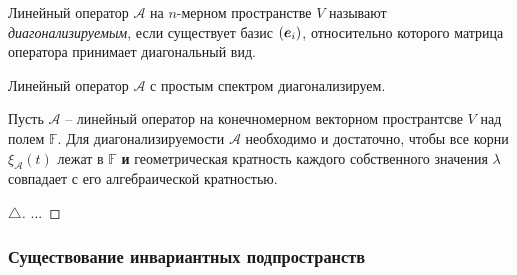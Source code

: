 \begin{to_def} 
    Линейный оператор $\mathcal A $ на $n $-мерном пространстве $V $ называют \textit{диагонализируемым}, если существует базис $(\mbox{\boldmath $e$}_i) $, относительно которого матрица оператора принимает диагональный вид. 
\end{to_def}

\begin{to_thr} 
    Линейный оператор $\mathcal A $ с простым спектром диагонализируем. 
\end{to_thr}

\begin{to_thr} 
    Пусть $\mathcal A $ -- линейный оператор на конечномерном векторном пространтсве $V $ над полем $\mathbb{F} $. Для диагонализируемости  $\mathcal A $ необходимо и достаточно, чтобы все корни $\xi_{\mathcal A} (t) $ лежат в $\mathbb{F} $  \textbf{и} геометрическая кратность каждого собственного значения $\lambda $ совпадает с его алгебраической кратностью.
\end{to_thr}

\begin{proof}[$\triangle$]
    ...
\end{proof}

\subsubsection{Существование инвариантных подпространств}
